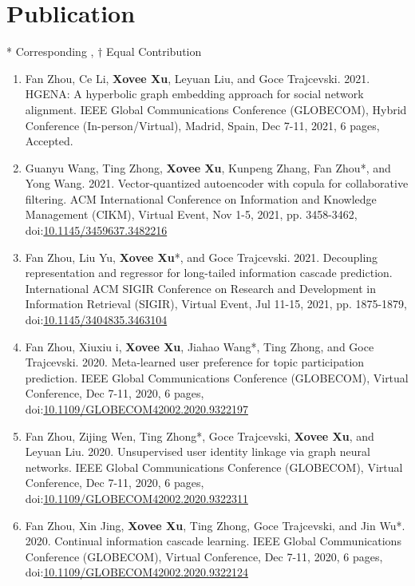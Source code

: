 \section*{Publication}
\indent

* Corresponding
, $\dagger$ Equal Contribution


\begin{enumerate}[resume]
    \item Fan Zhou, Ce Li, \textbf{Xovee Xu}, Leyuan Liu, and Goce Trajcevski. 2021. HGENA: A hyperbolic graph embedding approach for social network alignment. IEEE Global Communications Conference (GLOBECOM), Hybrid Conference (In-person/Virtual), Madrid, Spain, Dec 7-11, 2021, 6 pages, Accepted. 
    \item Guanyu Wang, Ting Zhong, \textbf{Xovee Xu}, Kunpeng Zhang, Fan Zhou*, and Yong Wang. 2021. Vector-quantized autoencoder with copula for collaborative filtering. ACM International Conference on Information and Knowledge Management (CIKM), Virtual Event, Nov 1-5, 2021, pp. 3458-3462, doi:\href{https://xovee.cn/html/paper-redirects/cikm2021.html}{10.1145/3459637.3482216}
    \item Fan Zhou, Liu Yu, \textbf{Xovee Xu}*, and Goce Trajcevski. 2021. Decoupling representation and regressor for long-tailed information cascade prediction. International ACM SIGIR Conference on Research and Development in Information Retrieval (SIGIR), Virtual Event, Jul 11-15, 2021, pp. 1875-1879, doi:\href{https://xovee.cn/html/paper-redirects/sigir2021.html}{10.1145/3404835.3463104}
    \item Fan Zhou, Xiuxiu \swashQ i, \textbf{Xovee Xu}, Jiahao Wang*, Ting Zhong, and Goce Trajcevski. 2020. Meta-learned user preference for topic participation prediction. IEEE Global Communications Conference (GLOBECOM), Virtual Conference, Dec 7-11, 2020, 6 pages, doi:\href{https://doi.org/10.1109/GLOBECOM42002.2020.9322197}{10.1109/GLOBECOM42002.2020.9322197}
    \item Fan Zhou, Zijing Wen, Ting Zhong*, Goce Trajcevski, \textbf{Xovee Xu}, and Leyuan Liu. 2020. Unsupervised user identity linkage via graph neural networks. IEEE Global Communications Conference (GLOBECOM), Virtual Conference, Dec 7-11, 2020, 6 pages, doi:\href{https://doi.org/10.1109/GLOBECOM42002.2020.9322311}{10.1109/GLOBECOM42002.2020.9322311}
    \item Fan Zhou, Xin Jing, \textbf{Xovee Xu}, Ting Zhong, Goce Trajcevski, and Jin Wu*. 2020. Continual information cascade learning. IEEE Global Communications Conference (GLOBECOM), Virtual Conference, Dec 7-11, 2020, 6 pages, doi:\href{https://doi.org/10.1109/GLOBECOM42002.2020.9322124}{10.1109/GLOBECOM42002.2020.9322124}

\end{enumerate}
